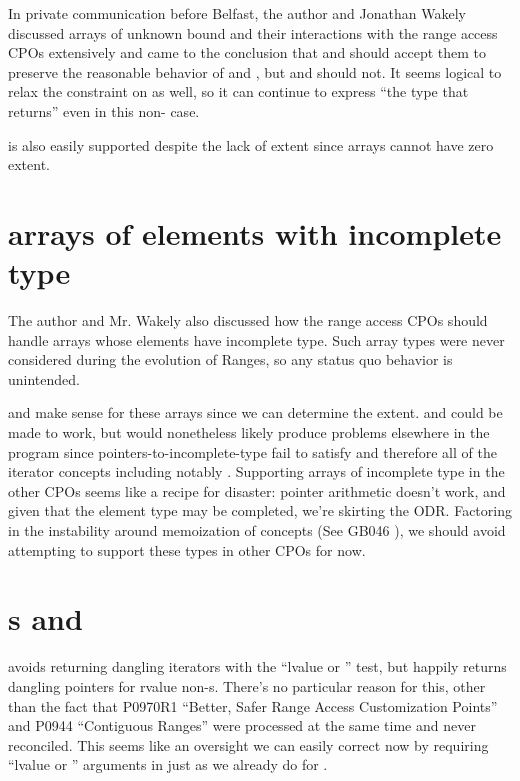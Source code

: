In private communication before Belfast,
the author and Jonathan Wakely discussed arrays of unknown bound
and their interactions with the range access CPOs extensively
and came to the conclusion that
 and  should accept them
to preserve the reasonable behavior of  and ,
but  and  should not.
It seems logical to relax the  constraint on  as well,
so it can continue to express ``the type that  returns''
even in this non- case.

 is also easily supported
despite the lack of extent
since arrays cannot have zero extent.


\section{arrays of elements with incomplete type}

The author and Mr. Wakely also discussed
how the range access CPOs should handle
arrays whose elements have incomplete type.
Such array types were never considered during the evolution of Ranges,
so any status quo behavior is unintended.

 and  make sense for these arrays since we can determine the extent.
 and  could be made to work,
but would nonetheless likely produce problems elsewhere in the program since
pointers-to-incomplete-type fail to satisfy 
and therefore all of the iterator concepts including notably .
Supporting arrays of incomplete type in the other CPOs seems like a recipe for disaster:
pointer arithmetic doesn't work, and given that the element type may be completed, we're skirting the ODR.
Factoring in the instability around memoization of concepts (See GB046 \cite{GB046}),
we should avoid attempting to support these types in other CPOs for now.


\section{s and }

 avoids returning dangling iterators
with the ``lvalue or '' test,
but  happily returns dangling pointers for rvalue non-s.
There's no particular reason for this, other than the fact that
P0970R1 ``Better, Safer Range Access Customization Points'' \cite{p0970r1} and
P0944 ``Contiguous Ranges'' \cite{p0944r0}
were processed at the same time and never reconciled.
This seems like an oversight we can easily correct now
by requiring ``lvalue or '' arguments
in  just as we already do for .


